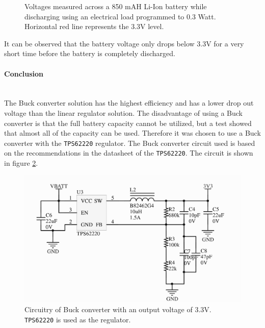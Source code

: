 \begin{figure}[h]
	\centering
	\caption[Discharge curve of Li-Ion battery.]{Voltages measured across a 850 mAH Li-Ion battery while discharging using an electrical load programmed to 0.3 Watt. Horizontal red line represents the 3.3V level.}
	\label{fig:bat_discharge}
\end{figure}

It can be observed that the battery voltage only drops below 3.3V for a very short time before the battery is completely discharged.

\paragraph{Conclusion}~\\
The Buck converter solution has the highest efficiency and has a lower drop out voltage than the linear regulator solution.
The disadvantage of using a Buck converter is that the full battery capacity cannot be utilized, but a test showed that almost all of the capacity can be used.
Therefore it was chosen to use a Buck converter with the \texttt{TPS62220} regulator. 
The Buck converter circuit used is based on the recommendations in the datasheet of the \texttt{TPS62220}.
The circuit is shown in figure \ref{fig:tps62220_circuit}.
\begin{figure}[h]
	\centering
    \includegraphics[width=.8\linewidth]{graphics/tps6220_circuit}
	\caption[3.3 V buck converter circuitry.]{Circuitry of Buck converter with an output voltage of 3.3V. \texttt{TPS62220} is used as the regulator.}
	\label{fig:tps62220_circuit}
\end{figure}


